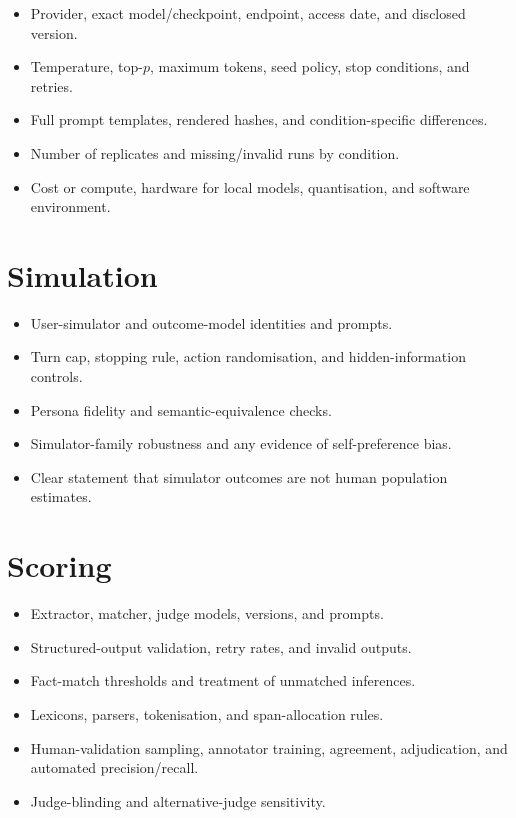 \begin{itemize}
    \item Provider, exact model/checkpoint, endpoint, access date, and disclosed version.
    \item Temperature, top-$p$, maximum tokens, seed policy, stop conditions, and retries.
    \item Full prompt templates, rendered hashes, and condition-specific differences.
    \item Number of replicates and missing/invalid runs by condition.
    \item Cost or compute, hardware for local models, quantisation, and software environment.
\end{itemize}

\section{Simulation}

\begin{itemize}
    \item User-simulator and outcome-model identities and prompts.
    \item Turn cap, stopping rule, action randomisation, and hidden-information controls.
    \item Persona fidelity and semantic-equivalence checks.
    \item Simulator-family robustness and any evidence of self-preference bias.
    \item Clear statement that simulator outcomes are not human population estimates.
\end{itemize}

\section{Scoring}

\begin{itemize}
    \item Extractor, matcher, judge models, versions, and prompts.
    \item Structured-output validation, retry rates, and invalid outputs.
    \item Fact-match thresholds and treatment of unmatched inferences.
    \item Lexicons, parsers, tokenisation, and span-allocation rules.
    \item Human-validation sampling, annotator training, agreement, adjudication, and automated precision/recall.
    \item Judge-blinding and alternative-judge sensitivity.
\end{itemize}

